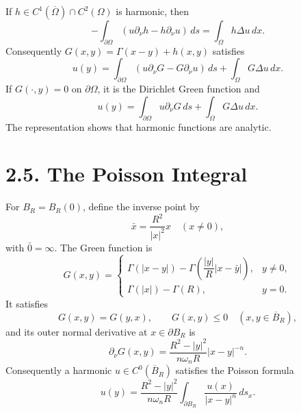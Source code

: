 If $h\in C^1(\overline\Omega)\cap C^2(\Omega)$ is harmonic, then
\begin{equation}
\tag{2.19}
-\int_{\partial\Omega}(u\partial_\nu h-h\partial_\nu u)\,ds
=\int_\Omega h\Delta u\,dx.
\end{equation}
Consequently $G(x,y)=\Gamma(x-y)+h(x,y)$ satisfies
\begin{equation}
\tag{2.20}
u(y)=\int_{\partial\Omega}(u\partial_\nu G-G\partial_\nu u)\,ds
+\int_\Omega G\Delta u\,dx.
\end{equation}
If $G(\cdot,y)=0$ on $\partial\Omega$, it is the Dirichlet Green function and
\begin{equation}
\tag{2.21}
u(y)=\int_{\partial\Omega}u\partial_\nu G\,ds
+\int_\Omega G\Delta u\,dx.
\end{equation}
The representation shows that harmonic functions are analytic.

\section*{2.5. The Poisson Integral}

For $B_R=B_R(0)$, define the inverse point by
\begin{equation}
\tag{2.22}
\bar x=\frac{R^2}{|x|^2}x\quad(x\ne0),
\end{equation}
with $\bar0=\infty$. The Green function is
\begin{equation}
\tag{2.23}
G(x,y)=
\begin{cases}
\Gamma(|x-y|)-\Gamma\left(\dfrac{|y|}{R}|x-\bar y|\right),&y\neq0,\\
\Gamma(|x|)-\Gamma(R),&y=0.
\end{cases}
\end{equation}
It satisfies
\begin{equation}
\tag{2.24}
G(x,y)=G(y,x),\qquad G(x,y)\leq0
\quad(x,y\in\overline B_R),
\end{equation}
and its outer normal derivative at $x\in\partial B_R$ is
\begin{equation}
\tag{2.25}
\partial_\nu G(x,y)=
\frac{R^2-|y|^2}{n\omega_nR}|x-y|^{-n}.
\end{equation}
Consequently a harmonic $u\in C^0(\overline B_R)$ satisfies the Poisson
formula
\begin{equation}
\tag{2.26}
u(y)=\frac{R^2-|y|^2}{n\omega_nR}
\int_{\partial B_R}\frac{u(x)}{|x-y|^n}\,ds_x.
\end{equation}

